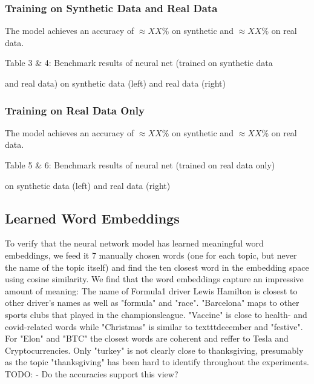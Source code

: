 \documentclass[11pt]{article}
\begin{document}
\subsubsection{Training on Synthetic Data and Real Data}

The model achieves an accuracy of $\approx XX\%$ on synthetic and $\approx XX\%$ on real data.
\begin{center}

\qquad

\end{center}
\begin{center}
Table 3 \& 4: Benchmark results of neural net (trained on synthetic data 

and real data) on synthetic data (left) and real data (right)
\end{center}


\subsubsection{Training on Real Data Only}
The model achieves an accuracy of $\approx XX\%$ on synthetic and $\approx XX\%$ on real data.
\begin{center}

\qquad

\end{center}
\begin{center}
Table 5 \& 6: Benchmark results of neural net (trained on real data only)

 on synthetic data (left) and real data (right)
\end{center}


\subsection{Learned Word Embeddings}
To verify that the neural network model has learned meaningful word embeddings, we feed it 7 manually chosen words (one for each topic, but never the name of the topic itself) and find the ten closest word in the embedding space using cosine similarity. We find that the word embeddings capture an impressive amount of meaning: The name of Formula1 driver Lewis Hamilton is closest to other driver's names as well as "formula" and "race". "Barcelona" maps to other sports clubs that played in the championsleague. "Vaccine" is close to health- and covid-related words while "Christmas" is similar to texttt{december} and "festive". For "Elon" and "BTC" the closest words are coherent and reffer to Tesla and Cryptocurrencies. Only "turkey" is not clearly close to thanksgiving, presumably as the topic "thanksgiving" has been hard to identify throughout the experiments.
TODO:
- Do the accuracies support this view?
\end{document}
